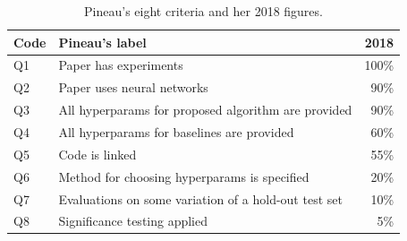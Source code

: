 \begin{table}[htbp]
\centering
\small
\caption{Pineau's eight criteria and her 2018 figures.}
\label{tab:a-pineau-2018}
\begin{tabular}{@{}llr@{}}
\toprule
Code & Pineau's label & 2018 \\
\midrule
Q1 & Paper has experiments & 100\% \\
Q2 & Paper uses neural networks & 90\% \\
Q3 & All hyperparams for proposed algorithm are provided & 90\% \\
Q4 & All hyperparams for baselines are provided & 60\% \\
Q5 & Code is linked & 55\% \\
Q6 & Method for choosing hyperparams is specified & 20\% \\
Q7 & Evaluations on some variation of a hold-out test set & 10\% \\
Q8 & Significance testing applied & 5\% \\
\bottomrule
\end{tabular}
\end{table}

